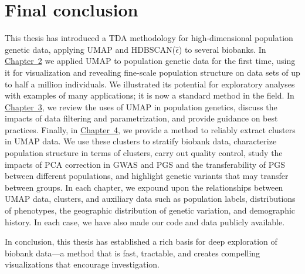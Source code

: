 \section{Final conclusion}
This thesis has introduced a TDA methodology for high-dimensional population genetic data, applying UMAP and HDBSCAN($\hat{\epsilon}$) to several biobanks. In \hyperref[chap:chapter2]{Chapter~2} we applied UMAP to population genetic data for the first time, using it for visualization and revealing fine-scale population structure on data sets of up to half a million individuals. We illustrated its potential for exploratory analyses with examples of many applications; it is now a standard method in the field. In \hyperref[chap:chapter3]{Chapter~3}, we review the uses of UMAP in population genetics, discuss the impacts of data filtering and parametrization, and provide guidance on best practices. Finally, in \hyperref[chap:chapter4]{Chapter~4}, we provide a method to reliably extract clusters in UMAP data. We use these clusters to stratify biobank data, characterize population structure in terms of clusters, carry out quality control, study the impacts of PCA correction in GWAS and PGS and the transferability of PGS between different populations, and highlight genetic variants that may transfer between groups. In each chapter, we expound upon the relationships between UMAP data, clusters, and auxiliary data such as population labels, distributions of phenotypes, the geographic distribution of genetic variation, and demographic history. In each case, we have also made our code and data publicly available. 

In conclusion, this thesis has established a rich basis for deep exploration of biobank data---a method that is fast, tractable, and creates compelling visualizations that encourage investigation.

\clearpage


